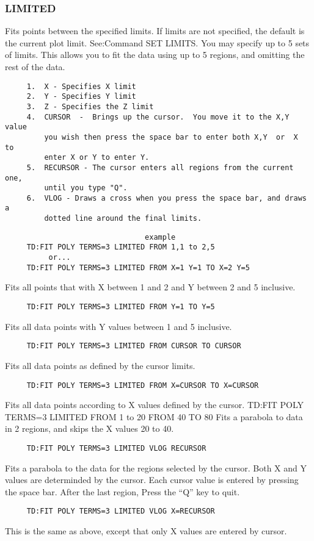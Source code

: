 \subsubsection{LIMITED     }
Fits points between the specified limits.  If limits are not specified,
the default is the current plot  limit.   See:Command SET LIMITS.   You
may  specify  up  to 5 sets of limits.  This allows you to fit the data
using up to 5 regions, and omitting the rest of the data.  
\begin{verbatim}
     1.  X - Specifies X limit 
     2.  Y - Specifies Y limit 
     3.  Z - Specifies the Z limit 
     4.  CURSOR  -  Brings up the cursor.  You move it to the X,Y value
         you wish then press the space bar to enter both X,Y  or  X  to
         enter X or Y to enter Y.  
     5.  RECURSOR - The cursor enters all regions from the current one,
         until you type "Q".  
     6.  VLOG - Draws a cross when you press the space bar, and draws a
         dotted line around the final limits.  
\end{verbatim}

\begin{verbatim}
                                example
     TD:FIT POLY TERMS=3 LIMITED FROM 1,1 to 2,5 
          or...  
     TD:FIT POLY TERMS=3 LIMITED FROM X=1 Y=1 TO X=2 Y=5 
\end{verbatim}
Fits  all  points  that  with  X  between 1 and 2 and Y between 2 and 5
inclusive.  
\begin{verbatim}
     TD:FIT POLY TERMS=3 LIMITED FROM Y=1 TO Y=5 
\end{verbatim}
Fits all data points with Y values between 1 and 5 inclusive.  
\begin{verbatim}
     TD:FIT POLY TERMS=3 LIMITED FROM CURSOR TO CURSOR 
\end{verbatim}
Fits all data points as defined by the cursor limits.  
\begin{verbatim}
     TD:FIT POLY TERMS=3 LIMITED FROM X=CURSOR TO X=CURSOR 
\end{verbatim}
Fits all data points according to X values defined by the cursor.  
TD:FIT POLY TERMS=3 LIMITED FROM 1 to 20 FROM 40 TO 80 
Fits a parabola to data in 2 regions, and skips the X values 20 to 40. 
\begin{verbatim}
     TD:FIT POLY TERMS=3 LIMITED VLOG RECURSOR 
\end{verbatim}
Fits  a  parabola  to  the data for the regions selected by the cursor.
Both X and Y values are determinded by the cursor.  Each  cursor  value
is entered by pressing the space bar.  After the last region, Press the
``Q'' key to quit.  
\begin{verbatim}
     TD:FIT POLY TERMS=3 LIMITED VLOG X=RECURSOR 
\end{verbatim}
This  is  the  same  as above, except that only X values are entered by
cursor.  
